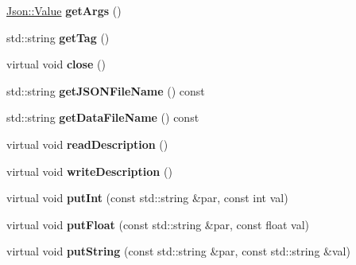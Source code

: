 \begin{DoxyCompactItemize}
\hyperlink{class_json_1_1_value}{Json\+::\+Value} {\bfseries get\+Args} ()
\item 
\mbox{\label{class_s_e_p_1_1json_generic_file_a634f919143b253d71502dc162253475a}} 
std\+::string {\bfseries get\+Tag} ()
\item 
\mbox{\label{class_s_e_p_1_1json_generic_file_a73fe59255fa62ee41cb4c81f834bb44b}} 
virtual void {\bfseries close} ()
\item 
\mbox{\label{class_s_e_p_1_1json_generic_file_a7980c21b990d3f78e6e7940579a68a81}} 
std\+::string {\bfseries get\+J\+S\+O\+N\+File\+Name} () const
\item 
\mbox{\label{class_s_e_p_1_1json_generic_file_a79949276ff691edc79a87eb46f6eb5e7}} 
std\+::string {\bfseries get\+Data\+File\+Name} () const
\item 
\mbox{\label{class_s_e_p_1_1json_generic_file_a053f1b762d56a4cbb2a31856185641d7}} 
virtual void {\bfseries read\+Description} ()
\item 
\mbox{\label{class_s_e_p_1_1json_generic_file_ae0d1491549e8d9246acf71ec4a2ae1d1}} 
virtual void {\bfseries write\+Description} ()
\item 
\mbox{\label{class_s_e_p_1_1json_generic_file_adcc39c2a9b17128deadedf66d34d8606}} 
virtual void {\bfseries put\+Int} (const std\+::string \&par, const int val)
\item 
\mbox{\label{class_s_e_p_1_1json_generic_file_a18e9eeccbd6dc2983a5598bbeac9a9e3}} 
virtual void {\bfseries put\+Float} (const std\+::string \&par, const float val)
\item 
\mbox{\label{class_s_e_p_1_1json_generic_file_af2ffe3655e32dcbed5a9a35bc74bff27}} 
virtual void {\bfseries put\+String} (const std\+::string \&par, const std\+::string \&val)
\item 
\mbox{\label{class_s_e_p_1_1json_generic_file_abc7fe61d4cca20f1943b013838398fa6}} 

\end{DoxyCompactItemize}
